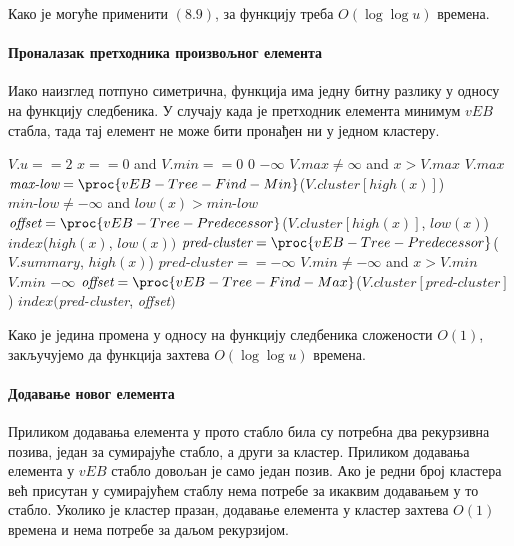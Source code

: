 \documentclass[11pt, a4paper]{article}
\theoremstyle{remark}
\numberwithin{equation}{section}
\begin{document}
	\indent Како је могуће применити $(8.9)$, за функцију  треба $O(\log\log u)$  времена.
	
	\paragraph{Проналазак претходника произвољног елемента}
	Иако наизглед потпуно симетрична, функција  има једну битну разлику у односу на функцију следбеника. У случају када је претходник елемента минимум $vEB$ стабла, тада тај елемент не може бити пронађен ни у једном кластеру.
	\begin{codebox}
	\li \If $V.u==2$
	\li \Do \If $x==0$ and $V.min==0$
	\li \Do \Return $0$
	\li \Else \Return $-\infty$
	\End
	\li \ElseIf $V.max \neq \infty$ and $x>V.max$
	\li \Do \Return $V.max$
	\End
	\li \Else $\textit{max-low}=\proc{vEB-Tree-Find-Min}$($V.cluster[high(x)]$)
	\li \Do \If $\textit{min-low}\neq -\infty$ and $low(x)>\textit{min-low}$
	\li \Do $\textit{offset}=\proc{vEB-Tree-Predecessor}$($V.cluster[high(x)]$, $low(x)$)
	\li \Return $index$($high(x)$, $low(x))$
	\li \Else $\textit{pred-cluster}=\proc{vEB-Tree-Predecessor}$($V.summary$, $high(x)$)
	\li \Do \If $\textit{pred-cluster}==-\infty$
	\li \Do \If $V.min\neq -\infty$ and $x>V.min$
	\li \Do \Return $V.min$
	\End
	\li \Do \Else \Return $-\infty$
	\End
	\li \Else $\textit{offset}=\proc{vEB-Tree-Find-Max}$($V.cluster[\textit{pred-cluster}]$)
	\li \Do \Return $index($\textit{pred-cluster}, \textit{offset}$)$ 
	\end{codebox}

	Како је једина промена у односу на функцију следбеника сложености $O(1)$, закључујемо да функција  захтева $O(\log\log u)$ времена.
	
	\paragraph{Додавање новог елемента}
	\begin{minipage}{\textwidth}
		Приликом додавања елемента у прото стабло била су потребна два рекурзивна позива, један за сумирајуће стабло, а други за кластер. Приликом додавања елемента у $vEB$ стабло довољан је само један позив. Ако је редни број кластера већ присутан у сумирајућем стаблу нема потребе за икаквим додавањем у то стабло. Уколико је кластер празан, додавање елемента у кластер захтева $O(1)$ времена и нема потребе за даљом рекурзијом. \\
	\end{minipage}
	
\end{document}
